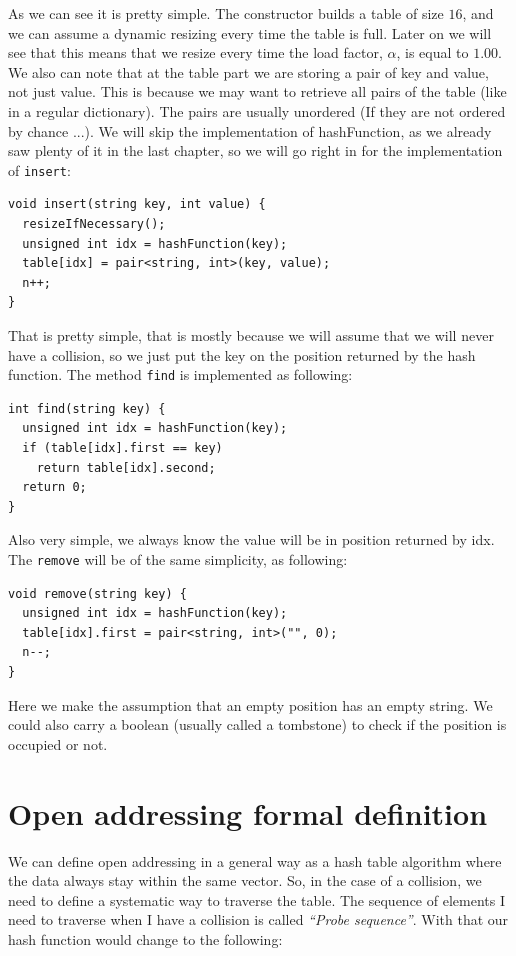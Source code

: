 As we can see it is pretty simple. The constructor builds a table of size \( 16 \), and we can assume a dynamic resizing every time the table is full. Later on we will see that this means that we resize every time the load factor, \( \alpha \), is equal to \( 1.00 \). We also can note that at the table part we are storing a pair of key and value, not just value. This is because we may want to retrieve all pairs of the table (like in a regular dictionary). The pairs are usually unordered (If they are not ordered by chance ...). We will skip the implementation of hashFunction, as we already saw plenty of it in the last chapter, so we will go right in for the implementation of \texttt{insert}:

\begin{lstlisting}
void insert(string key, int value) {
  resizeIfNecessary();
  unsigned int idx = hashFunction(key);
  table[idx] = pair<string, int>(key, value);
  n++;
}
\end{lstlisting}

That is pretty simple, that is mostly because we will assume that we will never have a collision, so we just put the key on the position returned by the hash function. The method \texttt{find} is implemented as following:

\begin{lstlisting}
int find(string key) {
  unsigned int idx = hashFunction(key);
  if (table[idx].first == key)
    return table[idx].second;
  return 0;
}
\end{lstlisting}

Also very simple, we always know the value will be in position returned by idx. The \texttt{remove} will be of the same simplicity, as following:

\begin{lstlisting}
void remove(string key) {
  unsigned int idx = hashFunction(key);
  table[idx].first = pair<string, int>("", 0);
  n--;
}
\end{lstlisting}

Here we make the assumption that an empty position has an empty string. We could also carry a boolean (usually called a tombstone) to check if the position is occupied or not. 

\section{Open addressing formal definition}

We can define open addressing in a general way as a hash table algorithm where the data always stay within the same vector. So, in the case of a collision, we need to define a systematic way to traverse the table. The sequence of elements I need to traverse when I have a collision is called \textit{``Probe sequence''}. With that our hash function would change to the following:

